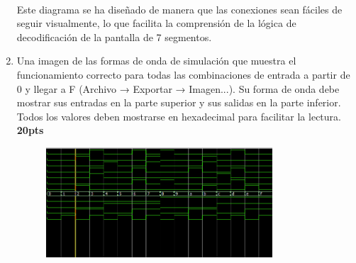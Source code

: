 \documentclass{templateNote}
\begin{document}
\begin{enumerate}
    \\Este diagrama se ha diseñado de manera que las conexiones sean fáciles de seguir visualmente, lo que facilita la comprensión de la lógica de decodificación de la pantalla de 7 segmentos.
    \item Una imagen de las formas de onda de simulación que muestra el funcionamiento correcto para todas las combinaciones de entrada a partir de 0 y llegar a F (Archivo → Exportar → Imagen...). Su forma de onda debe mostrar sus entradas en la parte superior y sus salidas en la parte inferior. Todos los valores deben mostrarse en hexadecimal para facilitar la lectura. \textbf{20pts}
    \begin{figure}[H]
        \centering
        \includegraphics[width=0.8\textwidth]{img/ondas.png}
    \end{figure}
\end{enumerate}
\end{document}
